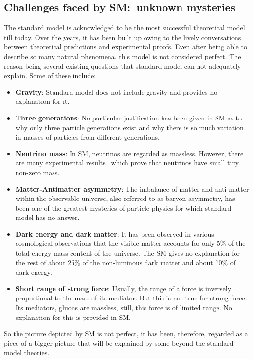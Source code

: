 \subsection{Challenges faced by SM:\ unknown mysteries}
The standard model is acknowledged to be the most successful theoretical model till today. Over the years, it has been built up owing to the lively
conversations between theoretical predictions and experimental proofs. Even after being able to describe so many natural phenomena, this model is not
considered perfect. The reason being several existing questions that standard model can not adequately explain. Some of these include:
\vspace{-0.15in}
\begin{itemize}
   \setlength\itemsep{0.03em}
\item {\bf{Gravity}}: Standard model does not include gravity and provides no explanation for it.
\item {\bf{Three generations}}: No particular justification has been given in SM as to why only three particle generations exist and why there is so much variation
  in masses of particles from different generations.
\item {\bf{Neutrino mass}}: In SM, neutrinos are regarded as massless. However, there are many experimental
  results~\cite{Fukuda:2001nk, Fukuda:1998mi, Araki:2004mb, Aliu:2004sq} which prove that neutrinos have small tiny non-zero mass.
\item {\bf{Matter-Antimatter asymmetry}}: The imbalance of matter and anti-matter within the observable universe, also referred to as baryon asymmetry,
  has been one of the greatest mysteries of particle physics for which standard model has no answer.
\item {\bf{Dark energy and dark matter}}: It has been observed in various cosmological observations that the visible matter accounts for only 5$\%$ of the total
  energy-mass content of the universe. The SM gives no explanation for the rest of about 25$\%$ of the non-luminous dark matter and about 70$\%$ of dark energy.   
\item {\bf{Short range of strong force}}: Usually, the range of a force is inversely proportional to the mass of its mediator. But this is not true for
  strong force. Its mediators, gluons are massless, still, this force is of limited range. No explanation for this is provided in SM. 
\end{itemize}
\vspace{-0.2in}
So the picture depicted by SM is not perfect, it has been, therefore, regarded as a piece of a bigger picture that will be explained by
some beyond the standard model theories. 

